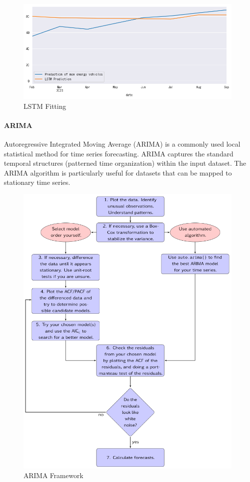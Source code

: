 \documentclass{apmcmthesis}
\begin{document}
\begin{figure}[h]
    \centering
    \includegraphics[scale=0.5]{figures/Figure/fitting.png}
    \caption{LSTM Fitting}
\end{figure}


\paragraph{ARIMA}
Autoregressive Integrated Moving Average (ARIMA) is a commonly used local statistical method for time series forecasting. ARIMA captures the standard temporal structures (patterned time organization) within the input dataset. The ARIMA algorithm is particularly useful for datasets that can be mapped to stationary time series.\cite{ARIMA}
\begin{figure}[h]
    \centering
    \includegraphics[scale=0.3]{figures/Figure/arimaflowchart.png}
    \caption{ARIMA Framework}
\end{figure}
\end{document}
